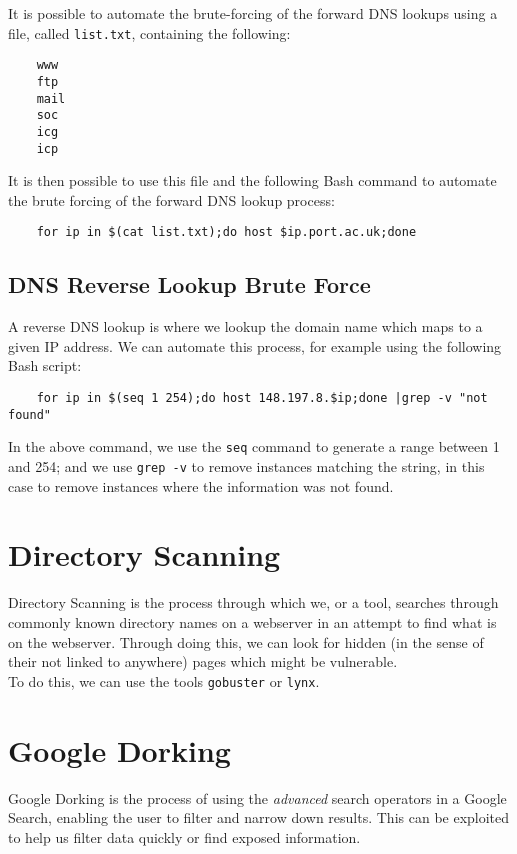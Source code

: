 It is possible to automate the brute-forcing of the forward DNS lookups using a file, called \verb|list.txt|, containing the following:
\begin{verbatim}
    www
    ftp
    mail
    soc
    icg
    icp
\end{verbatim}
It is then possible to use this file and the following Bash command to automate the brute forcing of the forward DNS lookup process:
\begin{verbatim}
    for ip in $(cat list.txt);do host $ip.port.ac.uk;done
\end{verbatim}

\subsection{DNS Reverse Lookup Brute Force}
A reverse DNS lookup is where we lookup the domain name which maps to a given IP address. We can automate this process, for example using the following Bash script:
\begin{verbatim}
    for ip in $(seq 1 254);do host 148.197.8.$ip;done |grep -v "not found"
\end{verbatim}

In the above command, we use the \verb|seq| command to generate a range between 1 and 254; and we use \verb|grep -v| to remove instances matching the string, in this case to remove instances where the information was not found. 

\section{Directory Scanning}
Directory Scanning is the process through which we, or a tool, searches through commonly known directory names on a webserver in an attempt to find what is on the webserver. Through doing this, we can look for hidden (in the sense of their not linked to anywhere) pages which might be vulnerable.\\

To do this, we can use the tools \verb|gobuster| or \verb|lynx|. 

\section{Google Dorking}
Google Dorking is the process of using the \textit{advanced} search operators in a Google Search, enabling the user to filter and narrow down results. This can be exploited to help us filter data quickly or find exposed information. 

